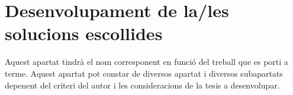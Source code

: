 \chapter{Desenvolupament de la/les solucions escollides}

Aquest apartat tindrà el nom corresponent en funció del treball que es porti a terme. Aquest apartat pot constar de diversos apartat i diversos subapartats depenent del criteri del autor i les consideracions de la tesis a desenvolupar.